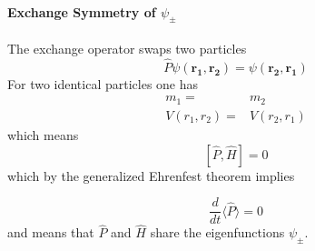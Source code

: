 \paragraph[Exchange Symmetry of psi]{Exchange Symmetry of $\psi_{\pm}$}


The exchange operator swaps two particles
\begin{equation*}
    \widehat{P}\psi(\mathbf{r_1},\mathbf{r_2})=\psi(\mathbf{r_2},\mathbf{r_1})
\end{equation*}
For two identical particles one has
\begin{align*}
    m_1=        & m_2        \\
    V(r_1,r_2)= & V(r_2,r_1)
\end{align*}
which means
\begin{equation*}
    \left[\widehat{P},\widehat{H}\right]=0
\end{equation*}
which by the generalized Ehrenfest theorem implies

\begin{equation*}
    \frac{d}{dt}\langle\widehat{P}\rangle=0
\end{equation*}
and means that $\widehat{P}$ and $\widehat{H}$ share the eigenfunctions $\psi_{\pm}$.


